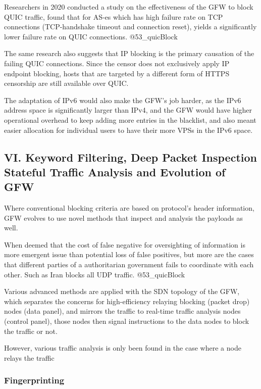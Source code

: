 Researchers in 2020 conducted a study on the effectiveness of the GFW to
block QUIC traffic, found that for AS-es which has high failure rate on
TCP connections (TCP-handshake timeout and connection reset), yields a
significantly lower failure rate on QUIC connections. @53\_quicBlock

The same research also suggests that IP blocking is the primary
causation of the failing QUIC connections. Since the censor does not
exclusively apply IP endpoint blocking, hosts that are targeted by a
different form of HTTPS censorship are still available over QUIC.

The adaptation of IPv6 would also make the GFW's job harder, as the IPv6
address space is significantly larger than IPv4, and the GFW would have
higher operational overhead to keep adding more entries in the
blacklist, and also meant easier allocation for individual users to have
their more VPSs in the IPv6 space.

\hypertarget{vi.-keyword-filtering-deep-packet-inspection-stateful-traffic-analysis-and-evolution-of-gfw}{%
\subsection{VI. Keyword Filtering, Deep Packet Inspection Stateful
Traffic Analysis and Evolution of
GFW}\label{vi.-keyword-filtering-deep-packet-inspection-stateful-traffic-analysis-and-evolution-of-gfw}}

Where conventional blocking criteria are based on protocol's header
information, GFW evolves to use novel methods that inspect and analysis
the payloads as well.

When deemed that the cost of false negative for oversighting of
information is more emergent issue than potential loss of false
positives, but more are the cases that different parties of a
authoritarian government fails to coordinate with each other. Such as
Iran blocks all UDP traffic. @53\_quicBlock

Various advanced methods are applied with the SDN topology of the GFW,
which separates the concerns for high-efficiency relaying blocking
(packet drop) nodes (data panel), and mirrors the traffic to real-time
traffic analysis nodes (control panel), those nodes then signal
instructions to the data nodes to block the traffic or not.

However, various traffic analysis is only been found in the case where a
node relays the traffic

\hypertarget{fingerprinting}{%
\subsubsection{Fingerprinting}\label{fingerprinting}}

